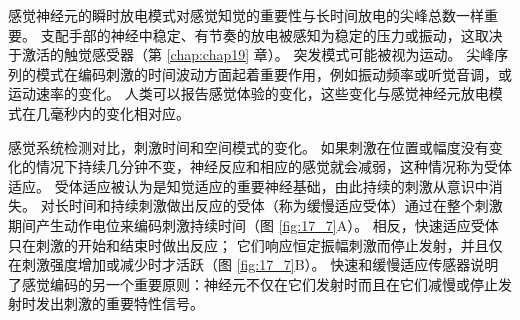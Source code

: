 感觉神经元的瞬时放电模式对感觉知觉的重要性与长时间放电的尖峰总数一样重要。 
支配手部的神经中稳定、有节奏的放电被感知为稳定的压力或振动，这取决于激活的触觉感受器（第 \ref{chap:chap19} 章）。 
突发模式可能被视为运动。 
尖峰序列的模式在编码刺激的时间波动方面起着重要作用，例如振动频率或听觉音调，或运动速率的变化。 
人类可以报告感觉体验的变化，这些变化与感觉神经元放电模式在几毫秒内的变化相对应。


感觉系统检测对比，刺激时间和空间模式的变化。 
如果刺激在位置或幅度没有变化的情况下持续几分钟不变，神经反应和相应的感觉就会减弱，这种情况称为受体适应。 
受体适应被认为是知觉适应的重要神经基础，由此持续的刺激从意识中消失。
对长时间和持续刺激做出反应的受体（称为缓慢适应受体）通过在整个刺激期间产生动作电位来编码刺激持续时间（图 \ref{fig:17_7}A）。 
相反，快速适应受体只在刺激的开始和结束时做出反应； 
它们响应恒定振幅刺激而停止发射，并且仅在刺激强度增加或减少时才活跃（图 \ref{fig:17_7}B）。 
快速和缓慢适应传感器说明了感觉编码的另一个重要原则：神经元不仅在它们发射时而且在它们减慢或停止发射时发出刺激的重要特性信号。

